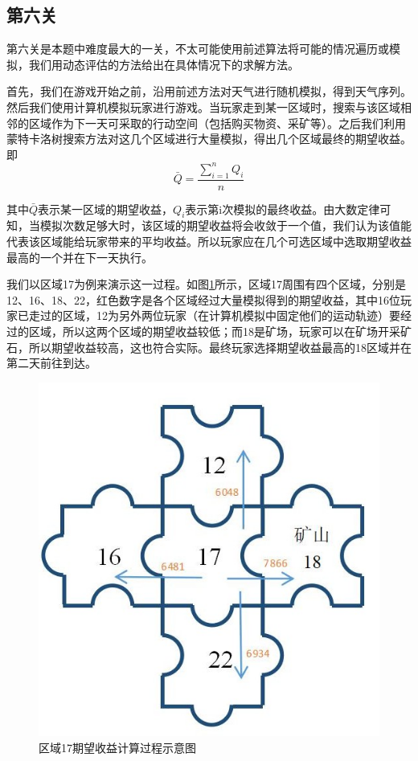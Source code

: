 \documentclass[withoutpre]{cumcmthesis} %
\begin{document}
\subsection{第六关}
第六关是本题中难度最大的一关，不太可能使用前述算法将可能的情况遍历或模拟，我们用动态评估的方法给出在具体情况下的求解方法。

首先，我们在游戏开始之前，沿用前述方法对天气进行随机模拟，得到天气序列。然后我们使用计算机模拟玩家进行游戏。当玩家走到某一区域时，搜索与该区域相邻的区域作为下一天可采取的行动空间（包括购买物资、采矿等）。之后我们利用蒙特卡洛树搜索方法对这几个区域进行大量模拟，得出几个区域最终的期望收益。即
\begin{equation}
\bar{Q}=\displaystyle\frac{\sum_{i=1}^{n}Q_i}{n}
\end{equation}

其中$\bar{Q}$表示某一区域的期望收益，$Q_i$表示第i次模拟的最终收益。由大数定律可知，当模拟次数足够大时，该区域的期望收益将会收敛于一个值，我们认为该值能代表该区域能给玩家带来的平均收益。所以玩家应在几个可选区域中选取期望收益最高的一个并在下一天执行。

我们以区域17为例来演示这一过程。如图\ref{fig:map6score}所示，区域17周围有四个区域，分别是12、16、18、22，红色数字是各个区域经过大量模拟得到的期望收益，其中16位玩家已走过的区域，12为另外两位玩家（在计算机模拟中固定他们的运动轨迹）要经过的区域，所以这两个区域的期望收益较低；而18是矿场，玩家可以在矿场开采矿石，所以期望收益较高，这也符合实际。最终玩家选择期望收益最高的18区域并在第二天前往到达。


\begin{figure}[H]
	\centering
	\includegraphics[scale=0.7]{figures/map6score}
	\caption{区域17期望收益计算过程示意图}
	\label{fig:map6score}
\end{figure}
\end{document}
